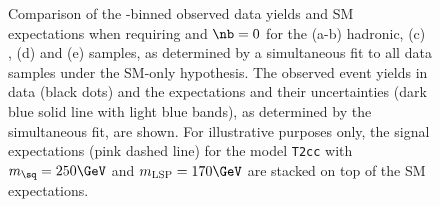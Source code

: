 \begin{figure}[t!]
\begin{center}
{    } 
    \caption{\label{fig:best-fit-ge4j0b} Comparison of the
      \scalht-binned observed data yields and SM expectations when
      requiring \njethigh and $\nb = 0$ for the (a-b) hadronic, (c)
      \mj, (d) \mmj and (e) \gj samples, as determined by a
      simultaneous fit to all data samples under the SM-only
      hypothesis. The observed event yields in data (black dots) and
      the expectations and their uncertainties (dark blue solid line
      with light blue bands), as determined by the simultaneous fit,
      are shown. For illustrative purposes only, the signal
      expectations (pink dashed line) for the model \texttt{T2cc} with
      $m_{\sq} = 250\GeV$ and $m_{\text{LSP}} = 170\GeV$ are stacked
      on top of the SM expectations.}
  \end{center}
\end{figure}

